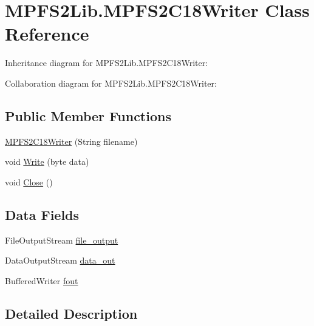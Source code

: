 \hypertarget{class_microchip_m_p_f_s_1_1_m_p_f_s2_lib_1_1_m_p_f_s2_c18_writer}{}\section{M\+P\+F\+S2\+Lib.\+M\+P\+F\+S2\+C18\+Writer Class Reference}
\label{class_microchip_m_p_f_s_1_1_m_p_f_s2_lib_1_1_m_p_f_s2_c18_writer}


Inheritance diagram for M\+P\+F\+S2\+Lib.\+M\+P\+F\+S2\+C18\+Writer\+:


Collaboration diagram for M\+P\+F\+S2\+Lib.\+M\+P\+F\+S2\+C18\+Writer\+:
\subsection*{Public Member Functions}
\begin{DoxyCompactItemize}
\item 
\hyperlink{class_microchip_m_p_f_s_1_1_m_p_f_s2_lib_1_1_m_p_f_s2_c18_writer_a2ec27f409c04322210be624776f45f86}{M\+P\+F\+S2\+C18\+Writer} (String filename)
\item 
void \hyperlink{class_microchip_m_p_f_s_1_1_m_p_f_s2_lib_1_1_m_p_f_s2_c18_writer_a9b9d2585120ffb9ce8a6e4f644ee9df7}{Write} (byte data)
\item 
void \hyperlink{class_microchip_m_p_f_s_1_1_m_p_f_s2_lib_1_1_m_p_f_s2_c18_writer_a7f7a3199c392465d0767c6506c1af5b4}{Close} ()
\end{DoxyCompactItemize}
\subsection*{Data Fields}
\begin{DoxyCompactItemize}
\item 
File\+Output\+Stream \hyperlink{class_microchip_m_p_f_s_1_1_m_p_f_s2_lib_1_1_m_p_f_s2_c18_writer_ab03cefa914341b065e79a003ebc36ba5}{file\+\_\+output}
\item 
Data\+Output\+Stream \hyperlink{class_microchip_m_p_f_s_1_1_m_p_f_s2_lib_1_1_m_p_f_s2_c18_writer_aa84dd7c55e2064a5c35cd88bc52176e3}{data\+\_\+out}
\item 
Buffered\+Writer \hyperlink{class_microchip_m_p_f_s_1_1_m_p_f_s2_lib_1_1_m_p_f_s2_c18_writer_aac232ca8514f156a01d70fd44afdd7c1}{fout}
\end{DoxyCompactItemize}


\subsection{Detailed Description}


